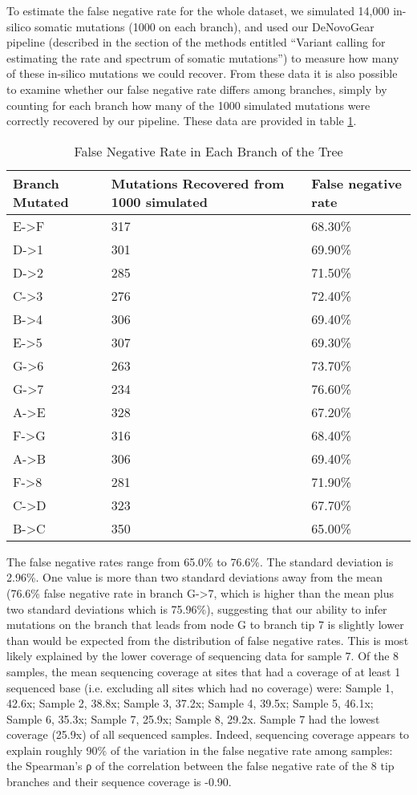To estimate the false negative rate for the whole dataset, we simulated 14,000 in-silico somatic mutations (1000 on each branch), and used our DeNovoGear pipeline (described in the section of the methods entitled “Variant calling for estimating the rate and spectrum of somatic mutations”)  to measure how many of these in-silico mutations we could recover. From these data it is also possible to examine whether our false negative rate differs among branches, simply by counting for each branch how many of the 1000 simulated mutations were correctly recovered by our pipeline. These data are provided in table \ref{table:supp_fnr}.

\begin{table}
\centering
\begin{tabularx}{\textwidth}{X X X}
\toprule
Branch Mutated & Mutations Recovered from 1000 simulated & False negative rate\\
\midrule
E->F & 317 & 68.30\%\\
D->1 & 301 & 69.90\%\\
D->2 & 285 & 71.50\%\\
C->3 & 276 & 72.40\%\\
B->4 & 306 & 69.40\%\\
E->5 & 307 & 69.30\%\\
G->6 & 263 & 73.70\%\\
G->7 & 234 & 76.60\%\\
A->E & 328 & 67.20\%\\
F->G & 316 & 68.40\%\\
A->B & 306 & 69.40\%\\
F->8 & 281 & 71.90\%\\
C->D & 323 & 67.70\%\\
B->C & 350 & 65.00\%\\
\bottomrule
\end{tabularx}
\caption{False Negative Rate in Each Branch of the Tree}
\label{table:supp_fnr}
\end{table}

The false negative rates range from 65.0\% to 76.6\%. The standard deviation is 2.96\%. One value is more than two standard deviations away from the mean (76.6\% false negative rate in branch G->7, which is higher than the mean plus two standard deviations which is 75.96\%), suggesting that our ability to infer mutations on the branch that leads from node G to branch tip 7 is slightly lower than would be expected from the distribution of false negative rates. This is most likely explained by the lower coverage of sequencing data for sample 7. Of the 8 samples, the mean sequencing coverage at sites that had a coverage of at least 1 sequenced base (i.e. excluding all sites which had no coverage) were: Sample 1, 42.6x; Sample 2, 38.8x; Sample 3, 37.2x; Sample 4, 39.5x; Sample 5, 46.1x; Sample 6, 35.3x; Sample 7, 25.9x; Sample 8, 29.2x. Sample 7 had the lowest coverage (25.9x) of all sequenced samples. Indeed, sequencing coverage appears to explain roughly 90\% of the variation in the false negative rate among samples: the Spearman’s ρ of the correlation between the false negative rate of the 8 tip branches and their sequence coverage is -0.90. 


